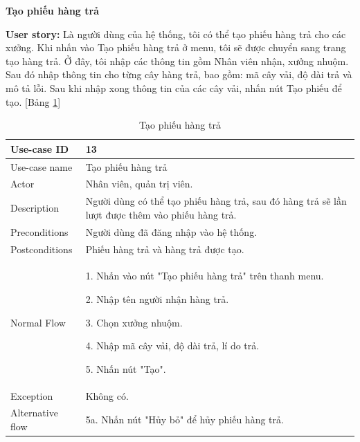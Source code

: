 \textbf{Tạo phiếu hàng trả}\par
\textbf{User story:} Là người dùng của hệ thống, tôi có thể tạo phiếu hàng trả cho các xưởng. Khi nhấn vào Tạo phiếu hàng trả ở menu, tôi sẽ được chuyển sang trang tạo hàng trả. Ở đây, tôi nhập các thông tin gồm Nhân viên nhận, xưởng nhuộm. Sau đó nhập thông tin cho từng cây hàng trả, bao gồm: mã cây vải, độ dài trả và mô tả lỗi. Sau khi nhập xong thông tin của các cây vải, nhấn nút Tạo phiếu để tạo. [Bảng \ref{bang13}]
\begin{table}[H]
    \centering
    \begin{tabular}{|m{3cm}|m{10cm}|}
    \hline 
        Use-case ID & 13\\ \hline
        Use-case name & Tạo phiếu hàng trả\\ \hline
        Actor & Nhân viên, quản trị viên.\\ \hline
        Description & Người dùng có thể tạo phiếu hàng trả, sau đó hàng trả sẽ lần lượt được thêm vào phiếu hàng trả.\\ \hline
        Preconditions & Người dùng đã đăng nhập vào hệ thống.\\ \hline
        Postconditions & Phiếu hàng trả và hàng trả được tạo.\\ \hline
        Normal Flow & 
        1. Nhấn vào nút "Tạo phiếu hàng trả" trên thanh menu.\par 
        2. Nhập tên người nhận hàng trả.\par
        3. Chọn xưởng nhuộm.\par 
        4. Nhập mã cây vải, độ dài trả, lí do trả.\par
        5. Nhấn nút "Tạo".
        \\ \hline
        Exception & Không có.
        \\ \hline
        Alternative flow & 
        5a. Nhấn nút "Hủy bỏ" để hủy phiếu hàng trả.
        \\ 
    \hline 
    \end{tabular}
    \caption{Tạo phiếu hàng trả}
    \label{bang13}
\end{table}



